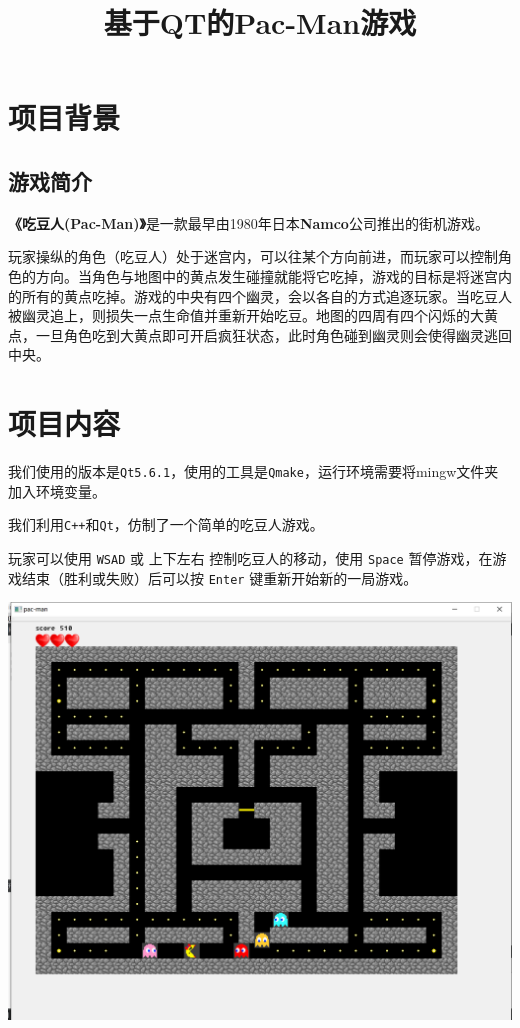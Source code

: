 \documentclass[UTF8,11pt]{ctexart}
\title{基于QT的Pac-Man游戏}
\date{}
\begin{document}
    \maketitle
    \section{项目背景}
    \subsection*{游戏简介}

	\textbf{《吃豆人(Pac-Man)》}是一款最早由1980年日本\textbf{Namco}公司推出的街机游戏。

	玩家操纵的角色（吃豆人）处于迷宫内，可以往某个方向前进，而玩家可以控制角色的方向。当角色与地图中的黄点发生碰撞就能将它吃掉，游戏的目标是将迷宫内的所有的黄点吃掉。游戏的中央有四个幽灵，会以各自的方式追逐玩家。当吃豆人被幽灵追上，则损失一点生命值并重新开始吃豆。地图的四周有四个闪烁的大黄点，一旦角色吃到大黄点即可开启疯狂状态，此时角色碰到幽灵则会使得幽灵逃回中央。
    \section{项目内容}
        我们使用的版本是\verb|Qt5.6.1|，使用的工具是\verb|Qmake|，运行环境需要将mingw文件夹加入环境变量。

        我们利用\verb|C++|和\verb|Qt|，仿制了一个简单的吃豆人游戏。

	    玩家可以使用 \verb|WSAD| 或 上下左右 控制吃豆人的移动，使用 \verb|Space| 暂停游戏，在游戏结束（胜利或失败）后可以按 \verb|Enter| 键重新开始新的一局游戏。
        
        \includegraphics[scale=0.14]{screenshoot.png}
\end{document}
